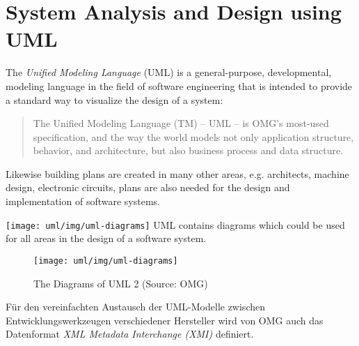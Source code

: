 \chapter{System Analysis and Design using UML}
%
The {\em Unified Modeling Language} (UML) is a general-purpose, developmental,
modeling language in the field of software engineering that is
intended to provide a standard way to visualize the design of a system:
\begin{quote}
The Unified Modeling Language (TM)
 -- UML -- is OMG's most-used specification, and
the way the world models not only application structure, behavior, and
architecture, but also business process and data structure.
\end{quote}

Likewise building plans are created in many other areas, e.g.
architects, machine design, electronic circuits, plans are
also needed for the design and implementation of software
systems.


\ifslides
\newslide
\texttt{[image: uml/img/uml-diagrams]}
\newslide
\else
UML contains diagrams which could be used for all
areas in the design of a software system.

\begin{figure}[H]
\texttt{[image: uml/img/uml-diagrams]}
\caption{The Diagrams of UML 2 (Source: OMG)}
\end{figure}
\fi

Für den vereinfachten Austausch der UML-Modelle zwischen
Entwicklungswerkzeugen verschiedener Hersteller wird von OMG auch das
Datenformat {\em XML Metadata Interchange (XMI)} definiert.

